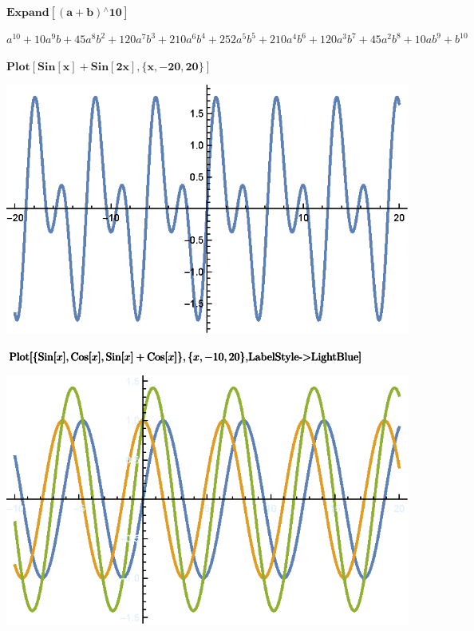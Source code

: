 \documentclass{article}
\begin{document}
\begin{doublespace}
\noindent\(\pmb{\text{Expand}[(a+b){}^{\wedge}10]}\)
\end{doublespace}

\begin{doublespace}
\noindent\(a^{10}+10 a^9 b+45 a^8 b^2+120 a^7 b^3+210 a^6 b^4+252 a^5 b^5+210 a^4 b^6+120 a^3 b^7+45 a^2 b^8+10 a b^9+b^{10}\)
\end{doublespace}

\begin{doublespace}
\noindent\(\pmb{\text{Plot}[\text{Sin}[x]+\text{Sin}[2x],\{x,-20,20\}]}\)
\end{doublespace}

\includegraphics{WLG_gr12.eps}

\begin{doublespace}
\noindent\(\pmb{\text{Plot}[\{\text{Sin}[x],\text{Cos}[x],\text{Sin}[x]+\text{Cos}[x]\},\{x,-10,20\},}\\
\pmb{\text{LabelStyle}\text{-$>$}\text{LightBlue}]}\)
\end{doublespace}

\includegraphics{WLG_gr13.eps}
\end{document}

